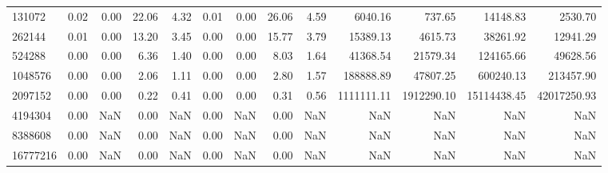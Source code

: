 \begin{tabular}{lrrrrrrrrrrrr}
131072 & 0.02 & 0.00 & 22.06 & 4.32 & 0.01 & 0.00 & 26.06 & 4.59 & 6040.16 & 737.65 & 14148.83 & 2530.70 \\
262144 & 0.01 & 0.00 & 13.20 & 3.45 & 0.00 & 0.00 & 15.77 & 3.79 & 15389.13 & 4615.73 & 38261.92 & 12941.29 \\
524288 & 0.00 & 0.00 & 6.36 & 1.40 & 0.00 & 0.00 & 8.03 & 1.64 & 41368.54 & 21579.34 & 124165.66 & 49628.56 \\
1048576 & 0.00 & 0.00 & 2.06 & 1.11 & 0.00 & 0.00 & 2.80 & 1.57 & 188888.89 & 47807.25 & 600240.13 & 213457.90 \\
2097152 & 0.00 & 0.00 & 0.22 & 0.41 & 0.00 & 0.00 & 0.31 & 0.56 & 1111111.11 & 1912290.10 & 15114438.45 & 42017250.93 \\
4194304 & 0.00 & NaN & 0.00 & NaN & 0.00 & NaN & 0.00 & NaN & NaN & NaN & NaN & NaN \\
8388608 & 0.00 & NaN & 0.00 & NaN & 0.00 & NaN & 0.00 & NaN & NaN & NaN & NaN & NaN \\
16777216 & 0.00 & NaN & 0.00 & NaN & 0.00 & NaN & 0.00 & NaN & NaN & NaN & NaN & NaN \\
\bottomrule
\end{tabular}
